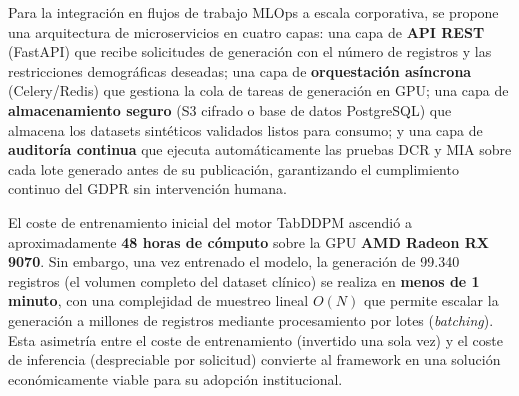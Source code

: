 Para la integración en flujos de trabajo MLOps a escala corporativa, se propone una arquitectura de microservicios en cuatro capas: una capa de \textbf{API REST} (FastAPI) que recibe solicitudes de generación con el número de registros y las restricciones demográficas deseadas; una capa de \textbf{orquestación asíncrona} (Celery/Redis) que gestiona la cola de tareas de generación en GPU; una capa de \textbf{almacenamiento seguro} (S3 cifrado o base de datos PostgreSQL) que almacena los datasets sintéticos validados listos para consumo; y una capa de \textbf{auditoría continua} que ejecuta automáticamente las pruebas DCR y MIA sobre cada lote generado antes de su publicación, garantizando el cumplimiento continuo del GDPR sin intervención humana.

El coste de entrenamiento inicial del motor TabDDPM ascendió a aproximadamente \textbf{48 horas de cómputo} sobre la GPU \textbf{AMD Radeon RX 9070}. Sin embargo, una vez entrenado el modelo, la generación de 99.340 registros (el volumen completo del dataset clínico) se realiza en \textbf{menos de 1 minuto}, con una complejidad de muestreo lineal $O(N)$ que permite escalar la generación a millones de registros mediante procesamiento por lotes (\textit{batching}). Esta asimetría entre el coste de entrenamiento (invertido una sola vez) y el coste de inferencia (despreciable por solicitud) convierte al framework en una solución económicamente viable para su adopción institucional.
